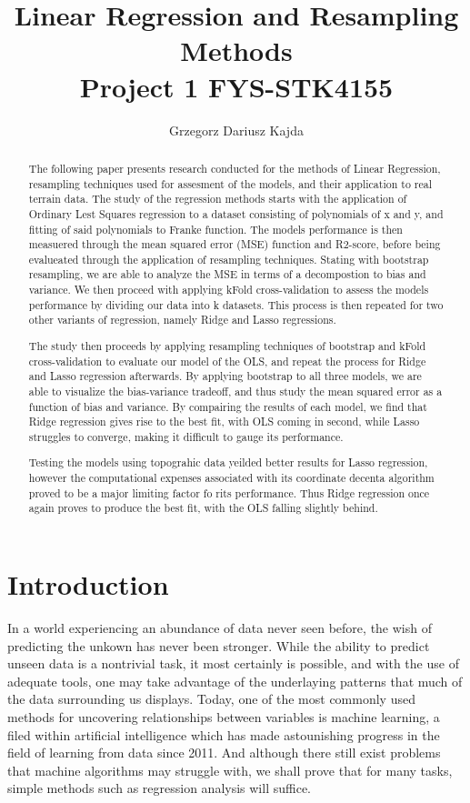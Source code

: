 \documentclass[a4paper, 10pt]{article}
\title{\Large Linear Regression and Resampling Methods \\	
		 \normalsize Project 1 FYS-STK4155}
\author{Grzegorz Dariusz Kajda}
\begin{document}
\maketitle

\begin{abstract}
	The following paper presents research conducted for the methods of Linear Regression, resampling techniques used for assesment of the models, and their application to real terrain data. The study of the regression methods starts with the application of Ordinary Lest Squares regression to a dataset consisting of polynomials of x and y, and fitting of said polynomials to Franke function. The models performance is then measuered through the mean squared error (MSE) function and R2-score, before being evalueated through the application of resampling techniques. Stating with bootstrap resampling, we are able to analyze the MSE in terms of a decompostion to bias and variance. We then proceed with applying kFold cross-validation to assess the models performance by dividing our data into k datasets. This process is then repeated for two other variants of regression, namely Ridge and Lasso regressions.  

	The study then proceeds by applying resampling techniques of bootstrap and kFold cross-validation to evaluate our model of the OLS, and repeat the process for Ridge and Lasso regression afterwards. By applying bootstrap to all three models, we are able to visualize the bias-variance tradeoff, and thus study the mean squared error as a function of bias and variance. By compairing the results of each model, we find that Ridge regression gives rise to the best fit, with OLS coming in second, while Lasso struggles to converge, making it difficult to gauge its performance.

	Testing the models using topograhic data yeilded better results for Lasso regression, however the computational expenses associated with its coordinate decenta algorithm proved to be a major limiting factor fo rits performance. Thus Ridge regression once again proves to produce the best fit, with the OLS falling slightly behind.      
\end{abstract}
\linespread{2.5}
\tableofcontents

\linespread{2.5}
\section{Introduction}
In a world experiencing an abundance of data never seen before, the wish of predicting the unkown has never been stronger. While the ability to predict unseen data is a nontrivial task, it most certainly is possible, and with the use of adequate tools, one may take advantage of the underlaying patterns that much of the data surrounding us displays. Today, one of the most commonly used methods for uncovering relationships between variables is machine learning, a filed within artificial intelligence which has made astounishing progress in the field of learning from data since 2011. And although there still exist problems that machine algorithms may struggle with, we shall prove that for many tasks, simple methods such as regression analysis will suffice.  
\end{document}
